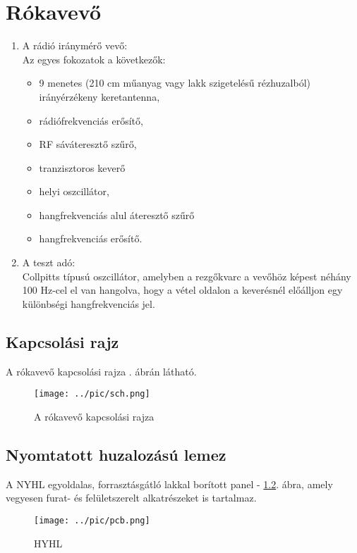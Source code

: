 \chapter{Rókavevő}

\begin{enumerate}
\item
A rádió iránymérő vevő:\\
	Az egyes fokozatok a következők:
	\begin{itemize}
	\item 9 menetes (210 cm műanyag vagy lakk szigetelésű rézhuzalból) irányérzékeny keretantenna,
	\item rádiófrekvenciás erősítő,
	\item RF sáváteresztő szűrő,
	\item tranzisztoros keverő
	\item helyi oszcillátor,
	\item hangfrekvenciás alul áteresztő szűrő
	\item hangfrekvenciás erősítő.
	\end{itemize}
\item
A teszt adó:\\
	Collpitts típusú oszcillátor, amelyben a rezgőkvarc a vevőhöz képest néhány 100 Hz-cel el van hangolva, hogy a vétel oldalon a keverésnél előálljon egy különbségi hangfrekvenciás jel.
\end{enumerate}

\newpage
\section{Kapcsolási rajz}

A rókavevő kapcsolási rajza . ábrán látható.

\begin{figure}[H]
\centering
\texttt{[image: ../pic/sch.png]}\\
\caption{A rókavevő kapcsolási rajza}
\label{fig:rokasch}
\end{figure}

\newpage
\section{Nyomtatott huzalozású lemez}

A NYHL egyoldalas, forrasztásgátló lakkal borított panel - \ref{fig:rokanyhl}. ábra, amely vegyesen furat- és felületszerelt alkatrészeket is tartalmaz.

\begin{figure}[H]
\centering
\texttt{[image: ../pic/pcb.png]}
\caption{HYHL}
\label{fig:rokanyhl}
\end{figure}


